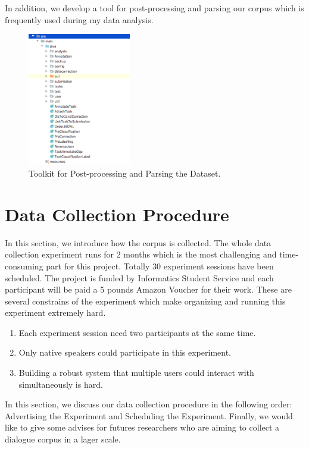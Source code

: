 \documentclass[bsc,frontabs,twoside,singlespacing,parskip,deptreport]{infthesis}     %
\begin{document}
In addition, we develop a tool for post-processing and parsing our corpus which is frequently used during my data analysis.

\begin{figure}[h]
    \centering
    \includegraphics[width=0.4\textwidth]{parser.png}
    \caption{Toolkit for Post-processing and Parsing the Dataset.}
    \label{fig:parser}
\end{figure}

\newpage
\section{Data Collection Procedure}

In this section, we introduce how the corpus is collected. The whole data collection experiment runs for 2 months which is the most challenging and time-consuming part for this project. Totally 30 experiment sessions have been scheduled. The project is funded by Informatics Student Service and each participant will be paid a 5 pounds Amazon Voucher for their work. These are several constrains of the experiment which make organizing and running this experiment extremely hard.

\begin{enumerate}
   \item Each experiment session need two participants at the same time. 

   \item Only native speakers could participate in this experiment.
 
   \item Building a robust system that multiple users could interact with simultaneously is hard. 
       
\end{enumerate}


In this section, we discuss our data collection procedure in the following order: Advertising the Experiment and Scheduling the Experiment. Finally, we would like to give some advises for futures researchers who are aiming to collect a dialogue corpus in a lager scale.
\end{document}

